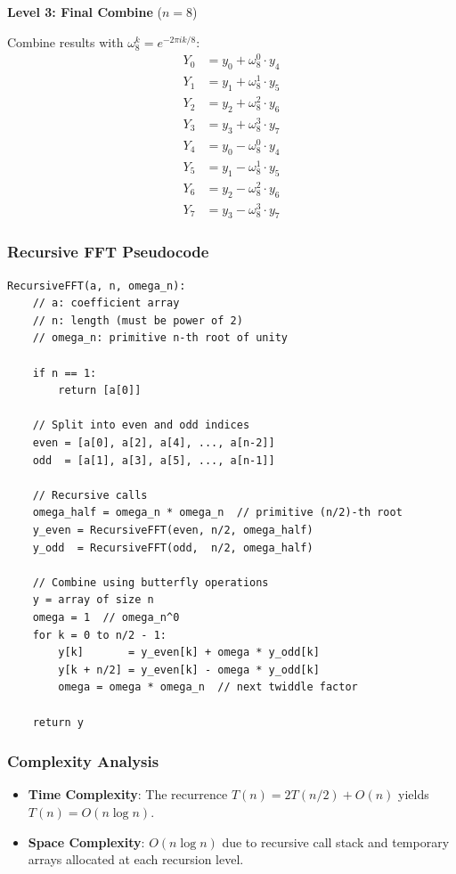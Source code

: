 \documentclass[a4paper]{article}
\theoremstyle{definition}
\begin{document}
\textbf{Level 3: Final Combine} (\( n=8 \))

Combine results with \(\omega_8^k = e^{-2\pi i k / 8}\):
\begin{align*}
Y_0 &= y_0 + \omega_8^0 \cdot y_4 \\
Y_1 &= y_1 + \omega_8^1 \cdot y_5 \\
Y_2 &= y_2 + \omega_8^2 \cdot y_6 \\
Y_3 &= y_3 + \omega_8^3 \cdot y_7 \\
Y_4 &= y_0 - \omega_8^0 \cdot y_4 \\
Y_5 &= y_1 - \omega_8^1 \cdot y_5 \\
Y_6 &= y_2 - \omega_8^2 \cdot y_6 \\
Y_7 &= y_3 - \omega_8^3 \cdot y_7
\end{align*}

\subsubsection{Recursive FFT Pseudocode}

\begin{verbatim}
RecursiveFFT(a, n, omega_n):
    // a: coefficient array
    // n: length (must be power of 2)
    // omega_n: primitive n-th root of unity

    if n == 1:
        return [a[0]]

    // Split into even and odd indices
    even = [a[0], a[2], a[4], ..., a[n-2]]
    odd  = [a[1], a[3], a[5], ..., a[n-1]]

    // Recursive calls
    omega_half = omega_n * omega_n  // primitive (n/2)-th root
    y_even = RecursiveFFT(even, n/2, omega_half)
    y_odd  = RecursiveFFT(odd,  n/2, omega_half)

    // Combine using butterfly operations
    y = array of size n
    omega = 1  // omega_n^0
    for k = 0 to n/2 - 1:
        y[k]       = y_even[k] + omega * y_odd[k]
        y[k + n/2] = y_even[k] - omega * y_odd[k]
        omega = omega * omega_n  // next twiddle factor

    return y
\end{verbatim}

\subsubsection{Complexity Analysis}

\begin{itemize}
    \item \textbf{Time Complexity}: The recurrence \( T(n) = 2T(n/2) + O(n) \) yields \( T(n) = O(n \log n) \).
    \item \textbf{Space Complexity}: \( O(n \log n) \) due to recursive call stack and temporary arrays allocated at each recursion level.
\end{itemize}
\end{document}
